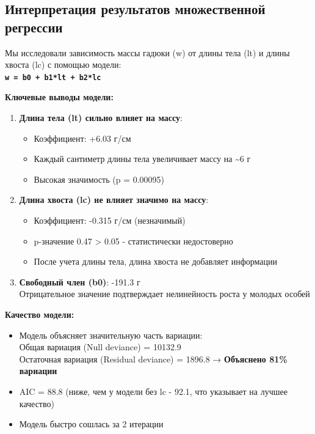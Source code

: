 \documentclass[
  letterpaper,
  DIV=11,
  numbers=noendperiod]{scrreprt}
\begin{document}
\subsection{\texorpdfstring{\textbf{Интерпретация результатов
множественной
регрессии}}{Интерпретация результатов множественной регрессии}}\label{ux438ux43dux442ux435ux440ux43fux440ux435ux442ux430ux446ux438ux44f-ux440ux435ux437ux443ux43bux44cux442ux430ux442ux43eux432-ux43cux43dux43eux436ux435ux441ux442ux432ux435ux43dux43dux43eux439-ux440ux435ux433ux440ux435ux441ux441ux438ux438}

Мы исследовали зависимость массы гадюки (w) от длины тела (lt) и длины
хвоста (lc) с помощью модели:\\
\textbf{\texttt{w\ =\ b0\ +\ b1*lt\ +\ b2*lc}}

\textbf{Ключевые выводы модели:}

\begin{enumerate}
\def\labelenumi{\arabic{enumi}.}
\item
  \textbf{Длина тела (lt) сильно влияет на массу}:

  \begin{itemize}
  \item
    Коэффициент: +6.03 г/см
  \item
    Каждый сантиметр длины тела увеличивает массу на \textasciitilde6 г
  \item
    Высокая значимость (p = 0.00095)
  \end{itemize}
\item
  \textbf{Длина хвоста (lc) не влияет значимо на массу}:

  \begin{itemize}
  \item
    Коэффициент: -0.315 г/см (незначимый)
  \item
    p-значение 0.47 \textgreater{} 0.05 - статистически недостоверно
  \item
    После учета длины тела, длина хвоста не добавляет информации
  \end{itemize}
\item
  \textbf{Свободный член (b0)}: -191.3 г\\
  Отрицательное значение подтверждает нелинейность роста у молодых
  особей
\end{enumerate}

\textbf{Качество модели:}

\begin{itemize}
\item
  Модель объясняет значительную часть вариации:\\
  Общая вариация (Null deviance) = 10132.9\\
  Остаточная вариация (Residual deviance) = 1896.8 → \textbf{Объяснено
  81\% вариации}
\item
  AIC = 88.8 (ниже, чем у модели без lc - 92.1, что указывает на лучшее
  качество)
\item
  Модель быстро сошлась за 2 итерации
\end{itemize}
\end{document}
